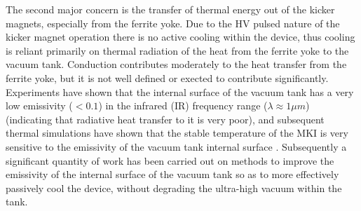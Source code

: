 The second major concern is the transfer of thermal energy out of the kicker magnets, especially from the ferrite yoke. Due to the HV pulsed nature of the kicker magnet operation there is no active cooling within the device, thus cooling is reliant primarily on thermal radiation of the heat from the ferrite yoke to the vacuum tank. Conduction contributes moderately to the heat transfer from the ferrite yoke, but it is not well defined or exected to contribute significantly. Experiments have shown that the internal surface of the vacuum tank has a very low emissivity ($< 0.1$) in the infrared (IR) frequency range ($\lambda \approx{} 1\mu m$) \cite{Barnes:emisMKI}(indicating that radiative heat transfer to it is very poor), and subsequent thermal simulations have shown that the stable temperature of the MKI is very sensitive to the emissivity of the vacuum tank internal surface \cite{Garlasche:2dHeatEmis}. Subsequently a significant quantity of work has been carried out on methods to improve the emissivity of the internal surface of the vacuum tank so as to more effectively passively cool the device, without degrading the ultra-high vacuum within the tank.